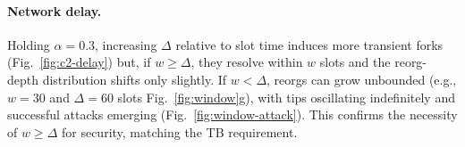 \paragraph{Network delay.}
Holding $\alpha=0.3$, increasing $\Delta$ relative to slot time induces more transient forks (Fig.~\ref{fig:c2-delay}) but, if $w\ge\Delta$, they resolve within $w$ slots and the reorg-depth distribution shifts only slightly. If $w<\Delta$, reorgs can grow unbounded (e.g., $w=30$ and $\Delta=60$ slots Fig.~\ref{fig:window}g), with tips oscillating indefinitely and successful attacks emerging (Fig.~\ref{fig:window-attack}). This confirms the necessity of $w\ge\Delta$ for security, matching the TB requirement.


